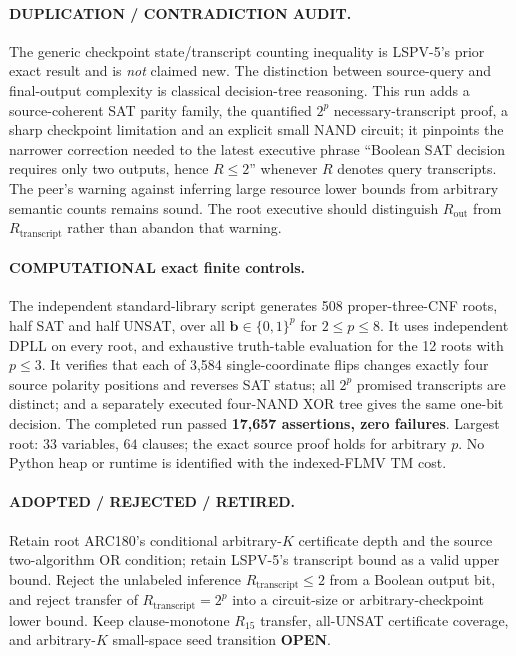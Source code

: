 \documentclass[11pt]{article}
\newcommand{\OPEN}{\textbf{OPEN}}
\begin{document}
\paragraph{DUPLICATION / CONTRADICTION AUDIT.} The generic checkpoint state/transcript counting inequality is LSPV-5's prior exact result and is \emph{not} claimed new. The distinction between source-query and final-output complexity is classical decision-tree reasoning. This run adds a source-coherent SAT parity family, the quantified $2^p$ necessary-transcript proof, a sharp checkpoint limitation and an explicit small NAND circuit; it pinpoints the narrower correction needed to the latest executive phrase ``Boolean SAT decision requires only two outputs, hence $R\le2$'' whenever $R$ denotes query transcripts. The peer's warning against inferring large resource lower bounds from arbitrary semantic counts remains sound. The root executive should distinguish $R_{\mathrm{out}}$ from $R_{\mathrm{transcript}}$ rather than abandon that warning.

\paragraph{COMPUTATIONAL exact finite controls.} The independent standard-library script generates 508 proper-three-CNF roots, half SAT and half UNSAT, over all $\mathbf b\in\{0,1\}^p$ for $2\le p\le8$. It uses independent DPLL on every root, and exhaustive truth-table evaluation for the 12 roots with $p\le3$. It verifies that each of 3,584 single-coordinate flips changes exactly four source polarity positions and reverses SAT status; all $2^p$ promised transcripts are distinct; and a separately executed four-NAND XOR tree gives the same one-bit decision. The completed run passed \textbf{17,657 assertions, zero failures}. Largest root: $33$ variables, $64$ clauses; the exact source proof holds for arbitrary $p$. No Python heap or runtime is identified with the indexed-FLMV TM cost.

\paragraph{ADOPTED / REJECTED / RETIRED.} Retain root ARC180's conditional arbitrary-$K$ certificate depth and the source two-algorithm OR condition; retain LSPV-5's transcript bound as a valid upper bound. Reject the unlabeled inference $R_{\mathrm{transcript}}\le2$ from a Boolean output bit, and reject transfer of $R_{\mathrm{transcript}}=2^p$ into a circuit-size or arbitrary-checkpoint lower bound. Keep clause-monotone $R_{15}$ transfer, all-UNSAT certificate coverage, and arbitrary-$K$ small-space seed transition \OPEN.
\end{document}
